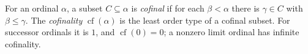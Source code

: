 
For an ordinal $\alpha$, a subset $C\subseteq\alpha$ is \emph{cofinal} if for each $\beta<\alpha$ there is $\gamma\in C$ with $\beta\le\gamma$. The \emph{cofinality} $\operatorname{cf}(\alpha)$ is the least order type of a cofinal subset. For successor ordinals it is $1$, and $\operatorname{cf}(0)=0$; a nonzero limit ordinal has infinite cofinality.
